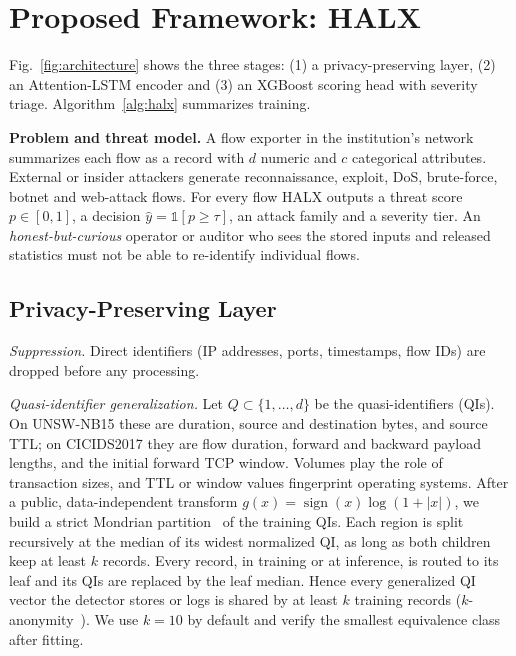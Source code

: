 \section{Proposed Framework: HALX}
\label{sec:method}
Fig.~\ref{fig:architecture} shows the three stages: (1) a privacy-preserving
layer, (2) an Attention-LSTM encoder and (3) an XGBoost scoring head with
severity triage. Algorithm~\ref{alg:halx} summarizes training.

\textbf{Problem and threat model.} A flow exporter in the institution's
network summarizes each flow as a record with $d$ numeric and $c$
categorical attributes. External or insider attackers generate
reconnaissance, exploit, DoS, brute-force, botnet and web-attack flows. For
every flow HALX outputs a threat score $p\in[0,1]$, a decision
$\hat{y}=\mathbb{1}[p\ge\tau]$, an attack family and a severity tier. An
\emph{honest-but-curious} operator or auditor who sees the stored inputs
and released statistics must not be able to re-identify individual flows.


\subsection{Privacy-Preserving Layer}
\label{sec:privacy}
\textit{Suppression.} Direct identifiers (IP addresses, ports,
timestamps, flow IDs) are dropped before any processing.

\textit{Quasi-identifier generalization.} Let $Q\subset\{1,\dots,d\}$ be the
quasi-identifiers (QIs). On UNSW-NB15 these are duration, source and
destination bytes, and source TTL; on CICIDS2017 they are flow duration,
forward and backward payload lengths, and the initial forward TCP window.
Volumes play the role of transaction sizes, and TTL or window values
fingerprint operating systems. After a public, data-independent transform
$g(x)=\operatorname{sign}(x)\log(1+|x|)$, we build a strict Mondrian
partition~\cite{lefevre2006mondrian} of the training QIs. Each region is
split recursively at the median of its widest normalized QI, as long as both
children keep at least $k$ records. Every record, in training or at
inference, is routed to its leaf and its QIs are replaced by the leaf median.
Hence every generalized QI vector the detector stores or logs is shared by
at least $k$ training records ($k$-anonymity~\cite{sweeney2002kanon}). We use
$k=10$ by default and verify the smallest equivalence class after fitting.

